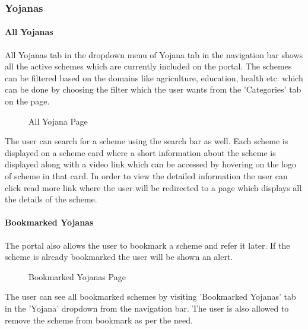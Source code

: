 \documentclass[conference]{IEEEtran}
\begin{document}
\subsubsection{Yojanas}
\paragraph{All Yojanas}
All Yojanas tab in the dropdown menu of Yojana tab in the navigation bar shows all the active schemes which are currently included on the portal. The schemes can be filtered based on the domains like agriculture, education, health etc. which can be done by choosing the filter which the user wants from the 'Categories' tab on the page.
\begin{figure}[h!]
\centering
{}
\caption{All Yojana Page}
\end{figure}
The user can search for a scheme using the search bar as well. Each scheme is displayed on a scheme card where a short information about the scheme is displayed along with a video link which can be accessed by hovering on the logo of scheme in that card. In order to view the detailed information the user can click read more link where the user will be redirected to a page which displays all the details of the scheme. 
\paragraph{Bookmarked Yojanas}
The portal also allows the user to bookmark a scheme and refer it later. If the scheme is already bookmarked the user will be shown an alert. 
\begin{figure}[h!]
\centering
{}
\caption{Bookmarked Yojanas Page}
\end{figure}
The user can see all bookmarked schemes by visiting 'Bookmarked Yojanas' tab in the 'Yojana' dropdown from the navigation bar. The user is also allowed to remove the scheme from bookmark as per the need.  
\end{document}
